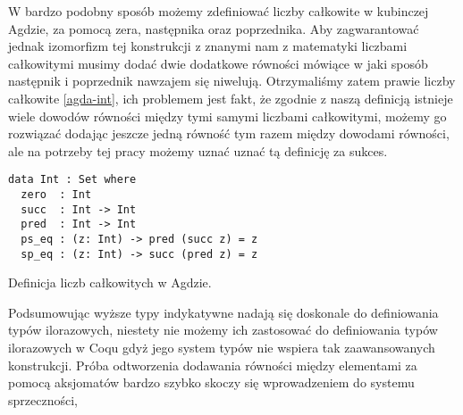 W bardzo podobny sposób możemy zdefiniować liczby całkowite w kubinczej Agdzie, za pomocą zera, następnika oraz poprzednika. Aby zagwarantować jednak izomorfizm tej konstrukcji z znanymi nam z matematyki liczbami całkowitymi musimy dodać dwie dodatkowe równości mówiące w jaki sposób następnik i poprzednik nawzajem się niwelują. Otrzymaliśmy zatem prawie liczby całkowite \ref{agda-int}, ich problemem jest fakt, że zgodnie z naszą definicją istnieje wiele dowodów równości między tymi samymi liczbami całkowitymi, możemy go rozwiązać dodając jeszcze jedną równość tym razem między dowodami równości, ale na potrzeby tej pracy możemy uznać uznać tą definicję za sukces.
\begin{code}
\begin{verbatim}
data Int : Set where
  zero  : Int
  succ  : Int -> Int
  pred  : Int -> Int
  ps_eq : (z: Int) -> pred (succ z) = z
  sp_eq : (z: Int) -> succ (pred z) = z
\end{verbatim}
\caption{Definicja liczb całkowitych w Agdzie.}
\label{agda-int}
\end{code}

Podsumowując wyższe typy indykatywne nadają się doskonale do definiowania typów ilorazowych, niestety nie możemy ich zastosować do definiowania typów ilorazowych w Coqu gdyż jego system typów nie wspiera tak zaawansowanych konstrukcji. Próba odtworzenia dodawania równości między elementami za pomocą aksjomatów bardzo szybko skoczy się wprowadzeniem do systemu sprzeczności, 